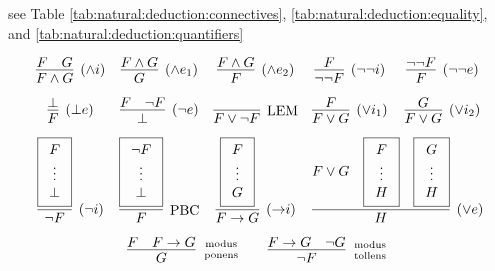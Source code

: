 
see Table \ref{tab:natural:deduction:connectives}, \ref{tab:natural:deduction:equality}, and \ref{tab:natural:deduction:quantifiers}

\begin{table}[hbt]
\begin{gather*}
\begin{array}{ccccc}
\infer[(\land i)]{F\land G}{F & G} 
&
\infer[(\land e_1)]{G}{F \land G} 
&
\infer[(\land e_2)]{F}{F \land G}
&
\infer[(\lnot\lnot i)]{\lnot\lnot F}{F} 
&
\infer[(\lnot\lnot e)]{F}{\lnot\lnot F}
\\[0.7em]
\infer[(\bot e)]{F}{\bot}
&
\infer[(\lnot e)]{\bot}{F & \lnot F}
&
\infer[\text{LEM}]{F\lor\lnot F}{}
&
\infer[(\lor i_1)]{F\lor G}{F}
&
\infer[(\lor i_2)]{F\lor G}{G}
\\[0.7em]
\infer[(\lnot i)]{\lnot F}{
	\boxed{\begin{array}{c}F\\\vdots\\\bot\end{array}}}
&
\infer[\text{PBC}]{F}{
	\boxed{\begin{array}{c}\lnot F\\\vdots\\\bot\end{array}}}
&
\infer[({\limp} i)]{F\limp G}{
	\boxed{\begin{array}{c}F\\\vdots\\G\end{array}
}}
&
\multicolumn{2}{l}{
	\infer[(\lor e)]{H}{
		F\lor G &
		\boxed{\begin{array}{c}F\\\vdots\\H\end{array}} &
		\boxed{\begin{array}{c}G\\\vdots\\H\end{array}}
	}	
}
\\[0.7em]
&
\multicolumn{3}{r}{
\infer[\text{modus}\atop\text{ponens}]{G}{F & F\limp G}
\qquad
\infer[\text{modus}\atop\text{tollens}]{\lnot F}{F\limp G & \lnot G}
}
&
\end{array}
\end{gather*}
\caption{Natural Deduction Rules for Connectives}
\label{tab:natural:deduction:connectives}
\end{table}

